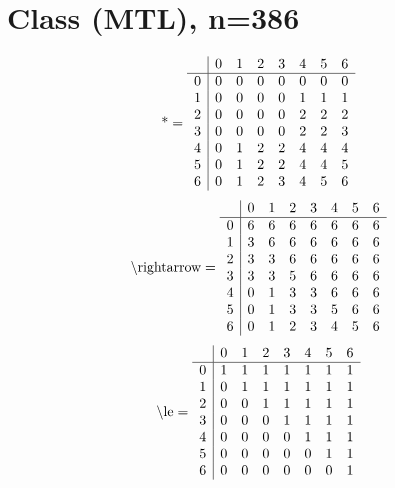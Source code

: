 \documentclass[11pt]{article}
\begin{document}
\section{Class (MTL), n=386}
\[\text{*} = 
\begin{array}{r | r r r r r r r}
 & 0 & 1 & 2 & 3 & 4 & 5 & 6 \\ \hline
0 & 0 & 0 & 0 & 0 & 0 & 0 & 0 \\
1 & 0 & 0 & 0 & 0 & 1 & 1 & 1 \\
2 & 0 & 0 & 0 & 0 & 2 & 2 & 2 \\
3 & 0 & 0 & 0 & 0 & 2 & 2 & 3 \\
4 & 0 & 1 & 2 & 2 & 4 & 4 & 4 \\
5 & 0 & 1 & 2 & 2 & 4 & 4 & 5 \\
6 & 0 & 1 & 2 & 3 & 4 & 5 & 6 \\
\end{array}
\]
\[\text{\textbackslash rightarrow} = 
\begin{array}{r | r r r r r r r}
 & 0 & 1 & 2 & 3 & 4 & 5 & 6 \\ \hline
0 & 6 & 6 & 6 & 6 & 6 & 6 & 6 \\
1 & 3 & 6 & 6 & 6 & 6 & 6 & 6 \\
2 & 3 & 3 & 6 & 6 & 6 & 6 & 6 \\
3 & 3 & 3 & 5 & 6 & 6 & 6 & 6 \\
4 & 0 & 1 & 3 & 3 & 6 & 6 & 6 \\
5 & 0 & 1 & 3 & 3 & 5 & 6 & 6 \\
6 & 0 & 1 & 2 & 3 & 4 & 5 & 6 \\
\end{array}
\]
\[\text{\textbackslash le} = 
\begin{array}{r | r r r r r r r}
 & 0 & 1 & 2 & 3 & 4 & 5 & 6 \\ \hline
0 & 1 & 1 & 1 & 1 & 1 & 1 & 1 \\
1 & 0 & 1 & 1 & 1 & 1 & 1 & 1 \\
2 & 0 & 0 & 1 & 1 & 1 & 1 & 1 \\
3 & 0 & 0 & 0 & 1 & 1 & 1 & 1 \\
4 & 0 & 0 & 0 & 0 & 1 & 1 & 1 \\
5 & 0 & 0 & 0 & 0 & 0 & 1 & 1 \\
6 & 0 & 0 & 0 & 0 & 0 & 0 & 1 \\
\end{array}
\]
\end{document}
